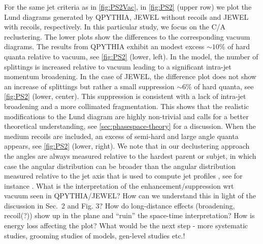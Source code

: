 
For the same jet criteria as in \autoref{fig:PS2Vac}, in \autoref{fig:PS2} (upper row) we plot the Lund diagrams generated by QPYTHIA, JEWEL without recoils and JEWEL with recoils, respectively. 
In this particular study, we focus on the C/A reclustering. The lower plots show the differences to the corresponding vacuum diagrams. The results from QPYTHIA exhibit an modest excess $\sim 10\%$ of hard quanta relative to vacuum, see \autoref{fig:PS2} (lower, left). In the model, the number of splittings is increased relative to vacuum leading to a significant intra-jet momentum broadening. 
In the case of JEWEL, the difference plot does not show an increase of splittings but rather a small suppression $\sim 6\%$ of hard quanta, see \autoref{fig:PS2} (lower, center). This suppression is consistent with a lack of intra-jet broadening and a more collimated fragmentation. 
This shows that the realistic modifications to the Lund diagram are highly non-trivial and calls for a better theoretical understanding, see \autoref{sec:phasespace-theory} for a discussion.
When the medium recoils are included, an excess of semi-hard and large angle quanta appears, see \autoref{fig:PS2} (lower, right). 
We note that in our declustering approach the angles are always measured relative to the hardest parent or subjet, in which case the angular distribution can be broader than the angular distribution measured relative to the jet axis that is used to compute jet profiles , see for instance \cite{KunnawalkamElayavalli:2017hxo}.
{\color{red} What is the interpretation of the enhancement/suppression wrt vacuum seen in QPYTHIA/JEWEL? How can we understand this in light of the discussion in Sec.~2 and Fig. 3? How do long-distance effects (broadening, recoil(?)) show up in the plane and ``ruin'' the space-time interpretation? How is energy loss affecting the plot? What would be the next step - more systematic studies, grooming studies of models, gen-level studies etc.!}

